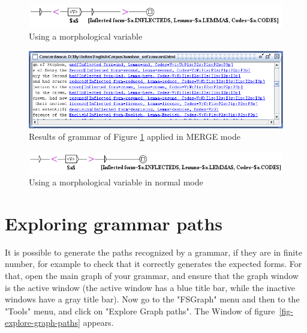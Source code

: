 \begin{figure}[!ht]
\begin{center}
\includegraphics[width=16cm]{resources/img/fig6-17o.png}
\caption{Using a morphological variable\label{fig-morpho5}}
\end{center}
\end{figure}

\begin{figure}[!ht]
\begin{center}
\includegraphics[width=15cm]{resources/img/fig6-17p.png}
\caption{Results of grammar of Figure \ref{fig-morpho5} applied in MERGE mode
\label{fig-morpho6}}
\end{center}
\end{figure}

\begin{figure}[!ht]
\begin{center}
\includegraphics[width=15.5cm]{resources/img/fig6-17q.png}
\caption{Using a morphological variable in normal mode\label{fig-morpho7}}
\end{center}
\end{figure}

\section{Exploring grammar paths}

It is possible to generate the paths recognized by a grammar, if they are in
finite number, for example to check that it correctly generates the expected
forms. For that, open the main graph of your grammar, and ensure that the graph
window is the active window (the active window has a blue title bar, while the
inactive windows have a gray title bar). Now go to the "FSGraph" menu and then to
the "Tools" menu, and click on "Explore Graph paths". The Window of
figure~\ref{fig-explore-graph-paths} appears.


